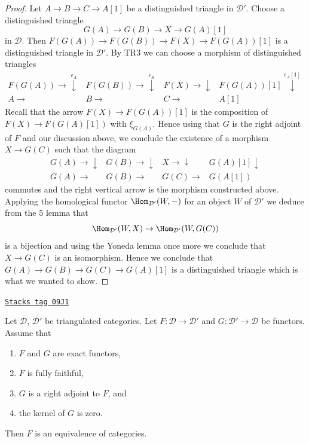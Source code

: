 \begin{proof}
\medskip\noindent
Let $A \to B \to C \to A[1]$ be a distinguished triangle in $\mathcal{D}'$.
Choose a distinguished triangle
$$
G(A) \to G(B) \to X \to G(A)[1]
$$
in $\mathcal{D}$. Then $F(G(A)) \to F(G(B)) \to F(X) \to F(G(A))[1]$
is a distinguished triangle in $\mathcal{D}'$. By TR3 we can choose
a morphism of distinguished triangles
$$
\begin{array}{cccc}F(G(A)) \longrightarrow\overset{\epsilon_A}{\downarrow} & F(G(B)) \longrightarrow\overset{\epsilon_B}{\downarrow} & F(X) \longrightarrow\downarrow & F(G(A))[1] \overset{\epsilon_A[1]}{\downarrow} \\ A \longrightarrow & B \longrightarrow & C \longrightarrow & A[1]\end{array}
$$
Recall that the arrow $F(X) \to F(G(A))[1]$ is the composition
of $F(X) \to F(G(A)[1])$ with $\xi_{G(A)}$. Hence using that
$G$ is the right adjoint of $F$ and our discussion above, we
conclude the existence of a morphism $X \to G(C)$
such that the diagram
$$
\begin{array}{cccc}G(A) \longrightarrow\downarrow & G(B) \longrightarrow\downarrow & X \longrightarrow\downarrow & G(A)[1] \downarrow \\ G(A) \longrightarrow & G(B) \longrightarrow & G(C) \longrightarrow & G(A[1])\end{array}
$$
commutes and the right vertical arrow is the morphism constructed above.
Applying the homological functor $\Hom_{\mathcal{D}'}(W, -)$
for an object $W$ of $\mathcal{D}'$ we deduce from the $5$ lemma that
$$
\Hom_{\mathcal{D}'}(W, X) \to \Hom_{\mathcal{D}'}(W, G(C))
$$
is a bijection and using the Yoneda lemma once more we conclude that
$X \to G(C)$ is an isomorphism. Hence we conclude that
$G(A) \to G(B) \to G(C) \to G(A)[1]$ is a distinguished triangle
which is what we wanted to show.
\end{proof}

\begin{lemma}
\label{derived-lemma-fully-faithful-adjoint-kernel-zero}
\href{https://stacks.math.columbia.edu/tag/09J1}{\texttt{Stacks tag 09J1}}

Let $\mathcal{D}$, $\mathcal{D}'$ be triangulated categories.
Let $F : \mathcal{D} \to \mathcal{D}'$ and
$G : \mathcal{D}' \to \mathcal{D}$ be functors. Assume that
\begin{enumerate}
\item $F$ and $G$ are exact functors,
\item $F$ is fully faithful,
\item $G$ is a right adjoint to $F$, and
\item the kernel of $G$ is zero.
\end{enumerate}
Then $F$ is an equivalence of categories.
\end{lemma}

